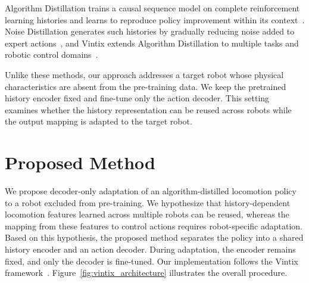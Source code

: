 \documentclass[runningheads]{llncs}
\begin{document}
Algorithm Distillation trains a causal sequence model on complete reinforcement learning histories and learns to reproduce policy improvement within its context~\cite{laskin2022incontextreinforcementlearningalgorithm}. 
Noise Distillation generates such histories by gradually reducing noise added to expert actions~\cite{zisman2024emergenceincontextreinforcementlearning}, and Vintix extends Algorithm Distillation to multiple tasks and robotic control domains~\cite{polubarov2025vintixactionmodelincontext}.

Unlike these methods, our approach addresses a target robot whose physical characteristics are absent from the pre-training data. We keep the pretrained history encoder fixed and fine-tune only the action decoder. This setting examines whether the history representation can be reused across robots while the output mapping is adapted to the target robot.

\section{Proposed Method}
\label{sec:proposed_method}

We propose decoder-only adaptation of an algorithm-distilled locomotion policy to a robot excluded from pre-training. 
We hypothesize that history-dependent locomotion features learned across multiple robots can be reused, whereas the mapping from these features to control actions requires robot-specific adaptation. 
Based on this hypothesis, the proposed method separates the policy into a shared history encoder and an action decoder. 
During adaptation, the encoder remains fixed, and only the decoder is fine-tuned. 
Our implementation follows the Vintix framework~\cite{polubarov2025vintixactionmodelincontext}. 
Figure~\ref{fig:vintix_architecture} illustrates the overall procedure.

\end{document}
